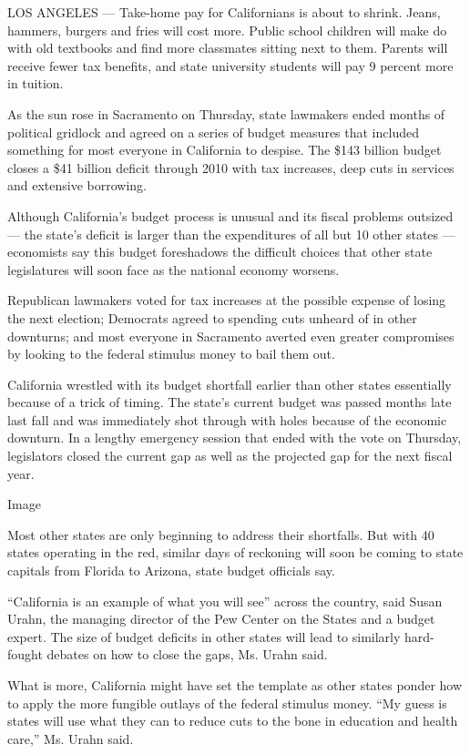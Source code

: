 LOS ANGELES --- Take-home pay for Californians is about to shrink.
Jeans, hammers, burgers and fries will cost more. Public school children
will make do with old textbooks and find more classmates sitting next to
them. Parents will receive fewer tax benefits, and state university
students will pay 9 percent more in tuition.

As the sun rose in Sacramento on Thursday, state lawmakers ended months
of political gridlock and agreed on a series of budget measures that
included something for most everyone in California to despise. The \$143
billion budget closes a \$41 billion deficit through 2010 with tax
increases, deep cuts in services and extensive borrowing.

Although California's budget process is unusual and its fiscal problems
outsized --- the state's deficit is larger than the expenditures of all
but 10 other states --- economists say this budget foreshadows the
difficult choices that other state legislatures will soon face as the
national economy worsens.

Republican lawmakers voted for tax increases at the possible expense of
losing the next election; Democrats agreed to spending cuts unheard of
in other downturns; and most everyone in Sacramento averted even greater
compromises by looking to the federal stimulus money to bail them out.

California wrestled with its budget shortfall earlier than other states
essentially because of a trick of timing. The state's current budget was
passed months late last fall and was immediately shot through with holes
because of the economic downturn. In a lengthy emergency session that
ended with the vote on Thursday, legislators closed the current gap as
well as the projected gap for the next fiscal year.

Image

Most other states are only beginning to address their shortfalls. But
with 40 states operating in the red, similar days of reckoning will soon
be coming to state capitals from Florida to Arizona, state budget
officials say.

``California is an example of what you will see'' across the country,
said Susan Urahn, the managing director of the Pew Center on the States
and a budget expert. The size of budget deficits in other states will
lead to similarly hard-fought debates on how to close the gaps, Ms.
Urahn said.

What is more, California might have set the template as other states
ponder how to apply the more fungible outlays of the federal stimulus
money. ``My guess is states will use what they can to reduce cuts to the
bone in education and health care,'' Ms. Urahn said.

